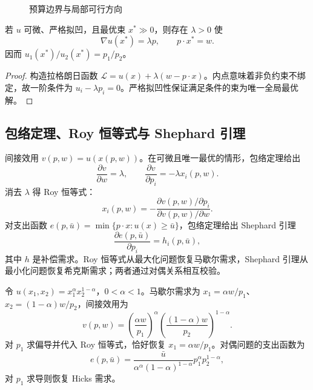 \begin{figure}[H]\centering
{}
\caption{预算边界与局部可行方向}
\end{figure}

\begin{theorem}[两商品内点需求的一阶条件]
若 $u$ 可微、严格拟凹，且最优束 $x^*\gg0$，则存在 $\lambda>0$ 使
\[
\nabla u(x^*)=\lambda p,\qquad p\cdot x^*=w.
\]
因而 $u_1(x^*)/u_2(x^*)=p_1/p_2$。
\end{theorem}
\begin{proof}
构造拉格朗日函数 $\mathcal L=u(x)+\lambda(w-p\cdot x)$。内点意味着非负约束不绑定，故一阶条件为
$u_i-\lambda p_i=0$。严格拟凹性保证满足条件的束为唯一全局最优解。
\end{proof}

\subsection{包络定理、Roy 恒等式与 Shephard 引理}
间接效用 $v(p,w)=u(x(p,w))$。在可微且唯一最优的情形，包络定理给出
\[
\frac{\partial v}{\partial w}=\lambda,\qquad
\frac{\partial v}{\partial p_i}=-\lambda x_i(p,w).
\]
消去 $\lambda$ 得 Roy 恒等式：
\[
x_i(p,w)=-\frac{\partial v(p,w)/\partial p_i}{\partial v(p,w)/\partial w}.
\]
对支出函数 $e(p,\bar u)=\min\{p\cdot x:u(x)\ge\bar u\}$，包络定理给出 Shephard 引理
\[
\frac{\partial e(p,\bar u)}{\partial p_i}=h_i(p,\bar u),
\]
其中 $h$ 是补偿需求。Roy 恒等式从最大化问题恢复马歇尔需求，Shephard 引理从最小化问题恢复希克斯需求；两者通过对偶关系相互校验。

\begin{example}
令 $u(x_1,x_2)=x_1^\alpha x_2^{1-\alpha}$，$0<\alpha<1$。马歇尔需求为
$x_1=\alpha w/p_1$、$x_2=(1-\alpha)w/p_2$，间接效用为
\[
v(p,w)=\left(\frac{\alpha w}{p_1}\right)^\alpha
\left(\frac{(1-\alpha)w}{p_2}\right)^{1-\alpha}.
\]
对 $p_1$ 求偏导并代入 Roy 恒等式，恰好恢复 $x_1=\alpha w/p_1$。对偶问题的支出函数为
\[
e(p,\bar u)=\frac{\bar u}{\alpha^\alpha(1-\alpha)^{1-\alpha}}p_1^\alpha p_2^{1-\alpha},
\]
对 $p_1$ 求导则恢复 Hicks 需求。
\end{example}

